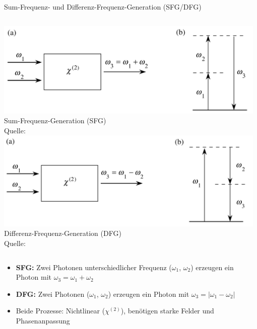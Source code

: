 \documentclass[notes=only]{beamer}
\newcommand{\figcite}[1]{\\[-3mm]{\tiny Quelle: \cite{#1}}}
\begin{document}
\begin{frame}{Sum-Frequenz- und Differenz-Frequenz-Generation (SFG/DFG)}
  \begin{columns}[T,onlytextwidth]
      \includegraphics[width=0.98\textwidth]{Images/sum-freq.png}\\[-1mm]{\tiny Sum-Frequenz-Generation (SFG) \figcite{Boyd2020}}
      \includegraphics[width=0.98\textwidth]{Images/diff-freq.png}\\[-1mm]{\tiny Differenz-Frequenz-Generation (DFG) \figcite{Boyd2020}}
  \end{columns}
  \vspace{0.2cm}
  \begin{itemize}
    \item \textbf{SFG:} Zwei Photonen unterschiedlicher Frequenz ($\omega_1$, $\omega_2$) erzeugen ein Photon mit $\omega_3 = \omega_1 + \omega_2$
    \item \textbf{DFG:} Zwei Photonen ($\omega_1$, $\omega_2$) erzeugen ein Photon mit $\omega_3 = |\omega_1 - \omega_2|$
    \item Beide Prozesse: Nichtlinear ($\chi^{(2)}$), benötigen starke Felder und Phasenanpassung
  \end{itemize}
\end{frame}
\end{document}
